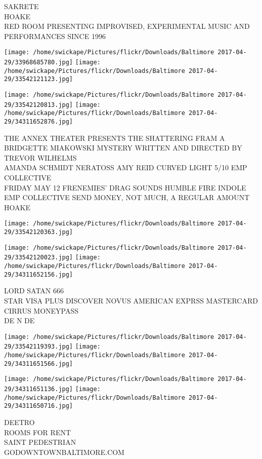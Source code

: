 \documentclass[10pt,letterpaper]{article}
\begin{document}
SAKRETE\\
HOAKE\\
RED ROOM PRESENTING IMPROVISED, EXPERIMENTAL MUSIC AND PERFORMANCES SINCE 1996
\pagebreak

\texttt{[image: /home/swickape/Pictures/flickr/Downloads/Baltimore 2017-04-29/33968685780.jpg]}
\texttt{[image: /home/swickape/Pictures/flickr/Downloads/Baltimore 2017-04-29/33542121123.jpg]}

\texttt{[image: /home/swickape/Pictures/flickr/Downloads/Baltimore 2017-04-29/33542120813.jpg]}
\texttt{[image: /home/swickape/Pictures/flickr/Downloads/Baltimore 2017-04-29/34311652876.jpg]}

THE ANNEX THEATER PRESENTS THE SHATTERING FRAM A BRIDGETTE MIAKOWSKI MYSTERY WRITTEN AND DIRECTED BY TREVOR WILHELMS\\
AMANDA SCHMIDT NERATOSS AMY REID CURVED LIGHT 5/10 EMP COLLECTIVE\\
FRIDAY MAY 12 FRENEMIES' DRAG SOUNDS HUMBLE FIRE INDOLE EMP COLLECTIVE SEND MONEY, NOT MUCH, A REGULAR AMOUNT\\
HOAKE
\pagebreak

\texttt{[image: /home/swickape/Pictures/flickr/Downloads/Baltimore 2017-04-29/33542120363.jpg]}

\vspace{0.25in}
\texttt{[image: /home/swickape/Pictures/flickr/Downloads/Baltimore 2017-04-29/33542120023.jpg]}
\texttt{[image: /home/swickape/Pictures/flickr/Downloads/Baltimore 2017-04-29/34311652156.jpg]}

LORD SATAN 666\\
STAR VISA PLUS DISCOVER NOVUS AMERICAN EXPRSS MASTERCARD CIRRUS MONEYPASS\\
DE N DE
\pagebreak

\texttt{[image: /home/swickape/Pictures/flickr/Downloads/Baltimore 2017-04-29/33542119393.jpg]}
\texttt{[image: /home/swickape/Pictures/flickr/Downloads/Baltimore 2017-04-29/34311651566.jpg]}

\texttt{[image: /home/swickape/Pictures/flickr/Downloads/Baltimore 2017-04-29/34311651136.jpg]}
\texttt{[image: /home/swickape/Pictures/flickr/Downloads/Baltimore 2017-04-29/34311650716.jpg]}

DEETRO\\
ROOMS FOR RENT\\
SAINT PEDESTRIAN\\
GODOWNTOWNBALTIMORE.COM
\pagebreak
\end{document}
